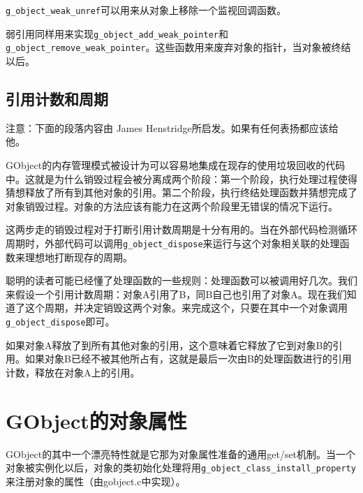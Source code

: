 \verb|g_object_weak_unref|可以用来从对象上移除一个监视回调函数。

弱引用同样用来实现\verb|g_object_add_weak_pointer|和\verb|g_object_remove_weak_pointer|。这些函数用来废弃对象的指针，当对象被终结以后。
\subsection{引用计数和周期}
注意：下面的段落内容由 James Henstridge所启发。如果有任何表扬都应该给他。

GObject的内存管理模式被设计为可以容易地集成在现存的使用垃圾回收的代码中。这就是为什么销毁过程会被分离成两个阶段：第一个阶段，执行处理过程使得猜想释放了所有到其他对象的引用。第二个阶段，执行终结处理函数并猜想完成了对象销毁过程。对象的方法应该有能力在这两个阶段里无错误的情况下运行。

这两步走的销毁过程对于打断引用计数周期是十分有用的。当在外部代码检测循环周期时，外部代码可以调用\verb|g_object_dispose|来运行与这个对象相关联的处理函数来理想地打断现存的周期。

聪明的读者可能已经懂了处理函数的一些规则：处理函数可以被调用好几次。我们来假设一个引用计数周期：对象A引用了B，同B自己也引用了对象A。现在我们知道了这个周期，并决定销毁这两个对象。来完成这个，只要在其中一个对象调用\verb|g_object_dispose|即可。

如果对象A释放了到所有其他对象的引用，这个意味着它释放了它到对象B的引用。如果对象B已经不被其他所占有，这就是最后一次由B的处理函数进行的引用计数，释放在对象A上的引用。

\section{GObject的对象属性}
GObject的其中一个漂亮特性就是它那为对象属性准备的通用get/set机制。当一个对象被实例化以后，对象的类初始化处理将用\verb|g_object_class_install_property|来注册对象的属性（由gobject.c中实现）。

